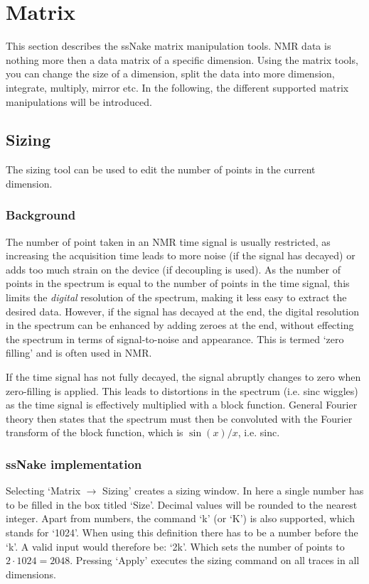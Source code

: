 \documentclass[11pt,a4paper]{article}
\begin{document}
\section{Matrix}
This section describes the ssNake matrix manipulation tools. NMR data is nothing more then a data matrix of a specific dimension. Using the matrix tools, you can change the size of a dimension, split the data into more dimension, integrate, multiply, mirror etc. In the following, the different supported matrix manipulations will be introduced.


\subsection{Sizing}
The sizing tool can be used to edit the number of points in the current dimension. 

\subsubsection*{Background}
The number of point taken in an NMR time signal is usually restricted, as increasing the acquisition time leads to more noise (if the signal has decayed) or adds too much strain on the device (if decoupling is used). As the number of points in the spectrum is equal to the number of points in the time signal, this limits the \textit{digital} resolution of the spectrum, making it less easy to extract the desired data. However, if the signal has decayed at the end, the digital resolution in the spectrum can be enhanced by adding zeroes at the end, without effecting the spectrum in terms of signal-to-noise and appearance. This is termed `zero filling' and is often used in NMR.

If the time signal has not fully decayed, the signal abruptly changes to zero when zero-filling is applied. This leads to distortions in the spectrum (i.e. sinc wiggles) as the time signal is effectively multiplied with a block function. General Fourier theory then states that the spectrum must then be convoluted with the Fourier transform of the block function, which is $\sin(x)/x$, i.e. sinc.

\subsubsection*{ssNake implementation}
Selecting `Matrix $\rightarrow$ Sizing' creates a sizing window. In here a single number has to be filled in the box titled `Size'. Decimal values will be rounded to the nearest integer. Apart from numbers, the command `k' (or `K') is also supported, which stands for `1024'. When using this definition there has to be a number before the `k'. A valid input would therefore be: `2k'. Which sets the number of points to $2 \cdot 1024=2048$. Pressing `Apply' executes the sizing command on all traces in all dimensions.
\end{document}
